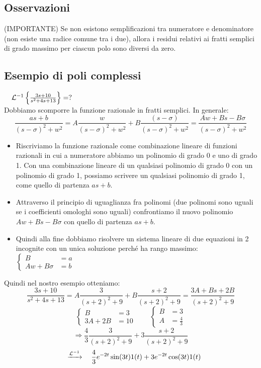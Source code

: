 \documentclass[../main.tex]{subfiles}
\begin{document}
	\subsection{Osservazioni}
	(IMPORTANTE) Se non esistono semplificazioni tra numeratore e denominatore (non esiste una radice comune tra i due), allora i residui relativi ai fratti semplici di grado massimo per ciascun polo sono diversi da zero.
	\subsection{Esempio di poli complessi}
	$ \quad \mathcal{L}^{-1} \left\lbrace \frac{3s+10}{s^2+4s+13} \right\rbrace = ? $\\
	\linebreak
	Dobbiamo scomporre la funzione razionale in fratti semplici. In generale:
	\[ \frac{as+b}{(s-\sigma)^2 + w^2} = A \frac{w}{(s-\sigma)^2 + w^2} + B \frac{(s-\sigma)}{(s-\sigma)^2 + w^2} = \frac{Aw +Bs- B\sigma}{(s-\sigma)^2 + w^2}\]
	\begin{itemize}
		\item Riscriviamo la funzione razionale come combinazione lineare di funzioni razionali in cui a numeratore abbiamo un polinomio di grado 0 e uno di grado 1. Con una combinazione lineare di un qualsiasi polinomio di grado 0 con un polinomio di grado 1, possiamo scrivere un qualsiasi polinomio di grado 1, come quello di partenza $as+b$.
		\item Attraverso il principio di uguaglianza fra polinomi (due polinomi sono uguali se i coefficienti omologhi sono uguali) confrontiamo il nuovo polinomio $ Aw +Bs- B\sigma $ con quello di partenza $as+b$.
		\item Quindi alla fine dobbiamo risolvere un sistema lineare di due equazioni in 2 incognite con un unica soluzione perch\'{e} ha rango massimo:  
		$\begin{cases}B &= a\\Aw + B\sigma &= b\end{cases}$
	\end{itemize}
	Quindi nel nostro esempio otteniamo:
	\[ \frac{3s+10}{s^2+4s+13} = A\frac{3}{(s+2)^2+9} + B\frac{s+2}{(s+2)^2+9} = \frac{3A + Bs + 2B}{(s+2)^2+9} \]
	\[ 
	\begin{cases} B &= 3\\ 3A + 2B &= 10\end{cases} \qquad
	\begin{cases} B &= 3\\ A &= \frac{4}{3}\end{cases} 
	\]
	\[ \Rightarrow \frac{4}{3} \frac{3}{(s+2)^2+9} + 3 \frac{s+2}{(s+2)^2+9} \]
	\[ \quad \xrightarrow{\mathcal{L}^{-1}} \quad \frac{4}{3} e^{-2t} \sin(3t) 1(t) + 3 e^{-2t} \cos(3t) 1(t) \]
\end{document}
